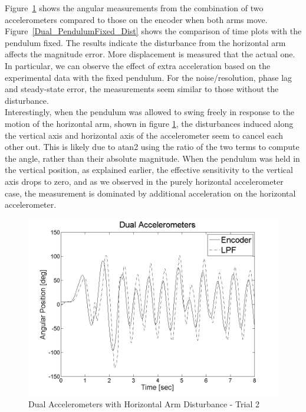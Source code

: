 \documentclass{article}
\theoremstyle{plain}
\theoremstyle{definition}
\theoremstyle{remark}
\begin{document}
Figure~\ref{Dual_Dist2} shows the angular measurements from the combination of two accelerometers compared to those on the encoder when both arms move. Figure~\ref{Dual_PendulumFixed_Dist} shows the comparison of time plots with the pendulum fixed. The results indicate the disturbance from the horizontal arm affects the magnitude error. More displacement is measured that the actual one. In particular, we can observe the effect of extra acceleration based on the experimental data with the fixed pendulum. For the noise/resolution, phase lag and steady-state error, the measurements seem similar to those without the disturbance.\\


Interestingly, when the pendulum was allowed to swing freely in response to the motion of the horizontal arm, shown in figure \ref{Dual_Dist2}, the disturbances induced along the vertical axis and horizontal axis of the accelerometer seem to cancel each other out.  This is likely due to atan2 using the ratio of the two terms to compute the angle, rather than their absolute magnitude.  When the pendulum was held in the vertical position, as explained earlier, the effective sensitivity to the vertical axis drops to zero, and as we observed in the purely horizontal accelerometer case, the measurement is dominated by additional acceleration on the horizontal accelerometer.  
      
\begin{figure}[hbt]
\begin{center}
\includegraphics[width = 12cm]{Dual_Dist2.png}
\caption{Dual Accelerometers with Horizontal Arm Disturbance - Trial 2}
\label{Dual_Dist2}
\end{center}
\end{figure}
\end{document}
